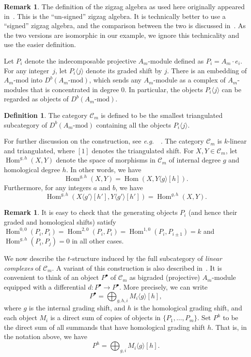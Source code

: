 \documentclass{amsart}
\theoremstyle{definition}
\newtheorem{definition}[theorem]{Definition}
\newtheorem{remark}[theorem]{Remark}
\DeclareMathOperator{\Hom}{Hom} %
\newcommand{\eg}{\textit{e.g.}~} %
\newcommand{\darkblue}{\color{darkblue}} %
\newcommand{\defn}[1]{\textsl{\darkblue #1}} %
\begin{document}
\begin{remark}
  The definition of the zigzag algebra as used here originally appeared in~\cite[Sect.~3]{hue.kho:01}.
  This is the ``un-signed'' zigzag algebra.
  It is technically better to use a ``signed'' zigzag algebra, and the comparison between the two is discussed in~\cite[Rem.~6.6]{bap.deo.lic:20}.
  As the two versions are isomorphic in our example, we ignore this technicality and use the easier definition.
\end{remark}

Let \(P_i\) denote the indecomposable projective \(A_m\)-module defined as \(P_i = A_m\cdot e_i\).
For any integer~\(j\), let \(P_i \langle j \rangle\) denote its graded shift by \(j\).
There is an embedding of \(A_m\text{-mod}\) into \(D^b(A_m\text{-mod})\), which sends any \(A_m\)-module as a complex of \(A_m\)-modules that is concentrated in degree \(0\).
In particular, the objects \(P_i\langle j \rangle\) can be regarded as objects of \(D^b(A_m\text{-mod})\).
\begin{definition}
  The category \(\mathcal{C}_m\) is defined to be the smallest triangulated subcategory of \(D^b(A_m\text{-mod})\) containing all the objects \(P_i\langle j \rangle\).
\end{definition}
For further discussion on the construction, see \eg~\cite[Sect.~2.3.3]{bap.deo.lic:22}.
The category \(\mathcal{C}_m\) is \(k\)-linear and triangulated, where \([1]\) denotes the triangulated shift.
For \(X, Y \in \mathcal{C}_m\), let \(\Hom^{g,h}(X,Y)\) denote the space of morphisms in \(\mathcal{C}_m\) of internal degree \(g\) and homological degree \(h\).
In other words, we have
\[\Hom^{g,h}(X,Y) = \Hom(X,Y\langle g \rangle[h]).\]
Furthermore, for any integers \(a\) and \(b\), we have
\[\Hom^{g,h}(X\langle g' \rangle[h'], Y\langle g' \rangle[h']) = \Hom^{g,h}(X,Y).\]

\begin{remark}\label{rem:generating-morphisms}
  It is easy to check that the generating objects \(P_i\) (and hence their graded and homological shifts) satisfy \(\Hom^{0,0}(P_i,P_i) = \Hom^{2,0}(P_i,P_i) = \Hom^{1,0}(P_i,P_{i\pm1}) = k\) and \(\Hom^{g,h}(P_i, P_j) = 0\) in all other cases.
\end{remark}

We now describe the \(t\)-structure induced by the full subcategory of \defn{linear complexes} of \(\mathcal{C}_m\).
A variant of this construction is also described in~\cite[Sect.~2.5]{lic.que:21}.
It is convenient to think of an object \(P^{\bullet}\) of \(\mathcal{C}_m\)
as bigraded (projective) \(A_m\)-module equipped with a differential \(d \colon P^{\bullet} \to P^{\bullet}\).
More precisely, we can write
\[P^{\bullet} = \bigoplus_{g,h,i} M_i\langle g \rangle[h],\]
where \(g\) is the internal grading shift, and \(h\) is the homological grading shift, and 
each object \(M_i\) is a direct sum of copies of objects in \(\{P_1,\ldots, P_m\}\).
Set \(P^h\) to be the direct sum of all summands that have homological grading shift \(h\).
That is, in the notation above, we have
\[P^{h} = \bigoplus_{g,i} M_i\langle g \rangle[h].\]
\end{document}
